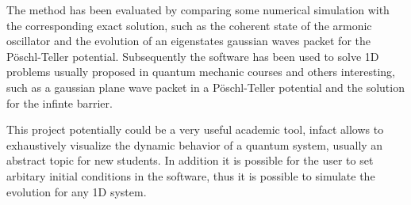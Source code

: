 \documentclass{article}
\begin{document}
The method has been evaluated by comparing some numerical simulation with the corresponding exact solution, such as the coherent state of the armonic oscillator and the evolution of an eigenstates gaussian waves packet for the P\"oschl-Teller potential. Subsequently the software has been used to solve 1D problems usually proposed in quantum mechanic courses and others interesting, such as a gaussian plane wave packet in a P\"oschl-Teller potential and the solution for the infinte barrier.

This project potentially could be a very useful academic tool, infact allows to exhaustively visualize the dynamic behavior of a quantum system, usually an abstract topic for new students. In addition it is possible for the user to set arbitary initial conditions in the software, thus it is possible to simulate the evolution for any 1D system.
\end{document}
